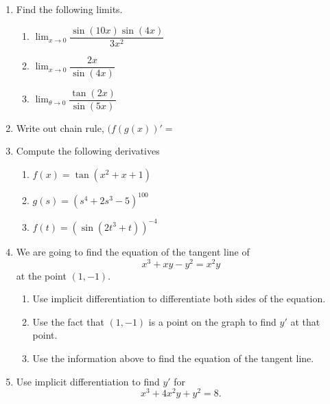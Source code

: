 \documentclass[12pt]{article}
\begin{document}
    \begin{enumerate}

\item Find the following limits.
    \begin{enumerate}
        \item $\displaystyle\lim_{x\to 0} \dfrac{\sin(10x)\sin(4x)}{3x^2}$
        \vfill

        \item $\displaystyle\lim_{x\to 0} \dfrac{2x}{\sin(4x)}$
        \vfill
        \item $\displaystyle\lim_{\theta\to 0} \dfrac{\tan(2x)}{\sin(5x)}$
        \vfill
    \end{enumerate}

\pagebreak

\item Write out chain rule, $(f(g(x))' = $
\vspace{0.1in}
\item Compute the following derivatives
\begin{enumerate}
    \item $f(x) = \tan(x^2+x+1)$
    \vfill

    \item $g(s) = (s^4+2s^3-5)^{100}$
    \vfill

    \item $f(t) = (\sin(2t^3+t))^{-4}$
    \vfill
\end{enumerate}
\pagebreak

 \item We are going to find the equation of the tangent line of $$x^3+xy-y^2=x^2y$$ at the point $(1,-1).$
    \begin{enumerate}
        \item Use implicit differentiation to differentiate both sides of the equation.
        \vspace{3in}

        \item Use the fact that $(1,-1)$ is a point on the graph to find $y'$ at that point.
        \vfill

        \item Use the information above to find the equation of the tangent line.
        \vspace{1in}
    \end{enumerate}
    \pagebreak
    
    \item Use implicit differentiation to find $y'$ for $$x^3 + 4x^2y + y^2 = 8.$$
\end{enumerate}
\end{document}

